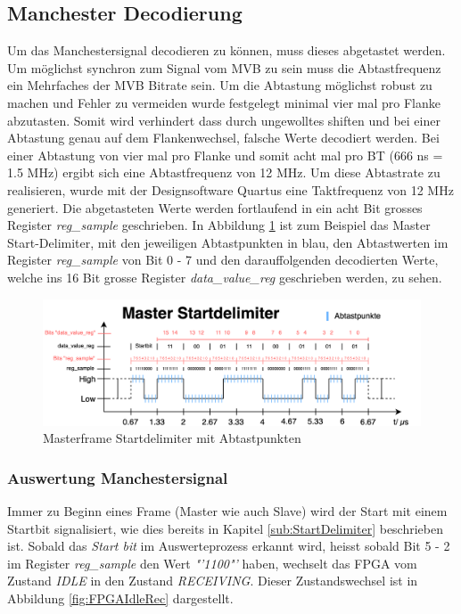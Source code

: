 \subsection{Manchester Decodierung}
\label{Manchester Decodierung}

Um das Manchestersignal decodieren zu können, muss dieses abgetastet werden. Um möglichst synchron zum
Signal vom MVB zu sein muss die Abtastfrequenz ein Mehrfaches der MVB Bitrate sein. Um die Abtastung möglichst
robust zu machen und Fehler zu vermeiden wurde festgelegt minimal vier mal pro Flanke abzutasten. Somit
wird verhindert dass durch ungewolltes shiften und bei einer Abtastung genau auf dem Flankenwechsel, falsche Werte
decodiert werden.
Bei einer Abtastung von vier mal pro Flanke und somit acht mal pro BT (666 ns = 1.5 MHz) ergibt sich eine Abtastfrequenz von 12 MHz.
Um diese Abtastrate zu realisieren, wurde mit der Designsoftware Quartus eine Taktfrequenz von 12 MHz generiert.
Die abgetasteten Werte werden fortlaufend in ein acht Bit grosses Register \textit{reg\_sample} geschrieben.
In Abbildung \ref{fig:MasterframeAbtastung} ist zum Beispiel das Master Start-Delimiter, mit den
jeweiligen Abtastpunkten in blau, den Abtastwerten im Register \textit{reg\_sample} von Bit 0 - 7 und den darauffolgenden decodierten 
Werte, welche ins 16 Bit grosse Register \textit{data\_value\_reg} geschrieben werden, zu sehen.

\begin{figure}[H]
    \centering
    \includegraphics[width=1\linewidth]{Figures/Chap3/FPGA/Abtastpunkte_Master.png}
    \caption{Masterframe Startdelimiter mit Abtastpunkten}
    \label{fig:MasterframeAbtastung}
\end{figure}

\subsubsection{Auswertung Manchestersignal}
\label{Auswertung Manchestersignal}
Immer zu Beginn eines Frame (Master wie auch Slave) wird der Start mit einem Startbit signalisiert, wie dies bereits in Kapitel \ref{sub:StartDelimiter} beschrieben ist.
Sobald das \textit{Start bit} im Auswerteprozess erkannt wird, heisst sobald Bit 5 - 2 im Register \textit{reg\_sample} den Wert \textit{"'1100"'} haben, wechselt das FPGA vom Zustand \textit{IDLE} in den Zustand \textit{RECEIVING}. Dieser Zustandswechsel ist in Abbildung \ref{fig:FPGAIdleRec} dargestellt.


